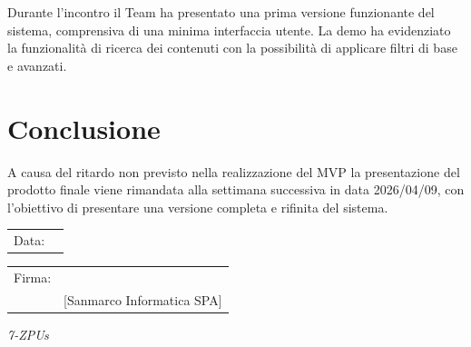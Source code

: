 \documentclass[a4paper,12pt]{article}
\begin{document}
Durante l'incontro il Team ha presentato una prima versione funzionante del sistema, comprensiva di una minima interfaccia utente. La demo ha evidenziato la funzionalità di ricerca dei contenuti con la possibilità di applicare filtri di base e avanzati.

\section{Conclusione}

A causa del ritardo non previsto nella realizzazione del MVP la presentazione del prodotto finale viene rimandata alla settimana successiva in data 2026/04/09, con l'obiettivo di presentare una versione completa e rifinita del sistema.

\vfill

\begin{flushleft}
\begin{tabular}{@{}p{0.5in}p{2in}@{}}
Data: & \hrulefill \\
\end{tabular}

\vspace{1em}

\begin{tabular}{@{}p{0.5in}p{2in}@{}}
Firma: & \hrulefill \\
& [Sanmarco Informatica SPA] \\
\end{tabular}
\end{flushleft}

\begin{flushright}
    \textit{7-ZPUs}
\end{flushright}
\end{document}
